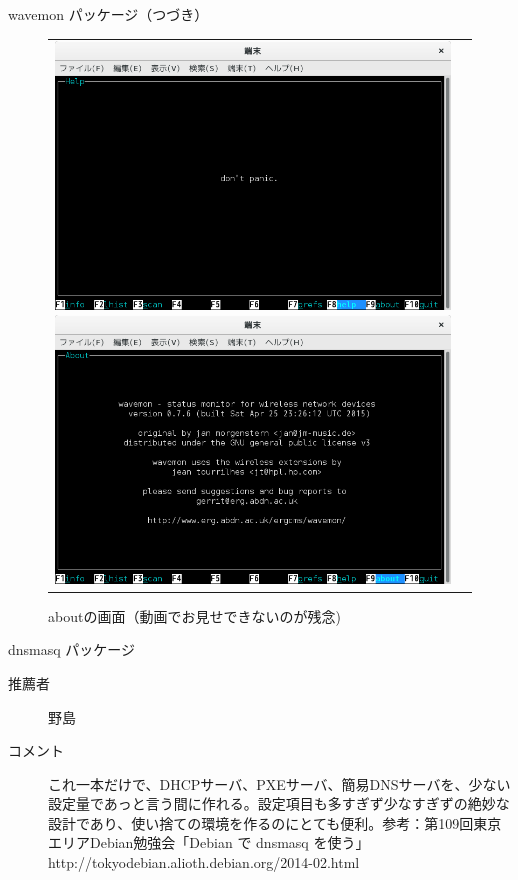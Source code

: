 \begin{frame}{wavemon パッケージ（つづき）}

\begin{figure}[htbp]
\begin{tabular}{cc}
\begin{minipage}{0.5\hsize}
\includegraphics[width=0.8\hsize]{image201512/wavemon-3.png}
\caption{helpの画面}
\end{minipage}
\begin{minipage}{0.5\hsize}
\includegraphics[width=0.8\hsize]{image201512/wavemon-4.png}
\caption{aboutの画面（動画でお見せできないのが残念)}
\end{minipage}
\end{tabular}
\end{figure}
\end{frame}

\begin{frame}{dnsmasq パッケージ}

  \begin{description}
    \item [推薦者] 野島
  　\item [コメント] これ一本だけで、DHCPサーバ、PXEサーバ、簡易DNSサーバを、少ない設定量であっと言う間に作れる。設定項目も多すぎず少なすぎずの絶妙な設計であり、使い捨ての環境を作るのにとても便利。参考：第109回東京エリアDebian勉強会「Debian で dnsmasq を使う」http://tokyodebian.alioth.debian.org/2014-02.html
  \end{description}

\end{frame}

